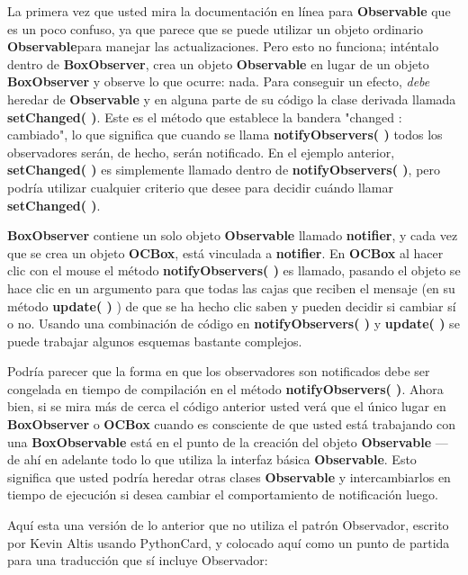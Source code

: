 \documentclass{article}
\begin{document}
La primera vez que usted mira la documentación en línea para \textbf{Observable} que es un poco confuso, ya que parece que se puede utilizar un objeto ordinario \textbf{Observable}para manejar las actualizaciones. Pero esto no funciona; inténtalo \- dentro de \textbf{BoxObserver}, crea un objeto \textbf{Observable} en lugar de un objeto \textbf{BoxObserver} y observe lo que ocurre: nada. Para conseguir un efecto, \textit{debe} heredar de \textbf{Observable} y en alguna parte de su código la clase derivada llamada \textbf{setChanged( )}. Este es el método que establece la bandera "changed : cambiado", lo que significa que cuando se llama \textbf{notifyObservers( )} todos los observadores serán, de hecho, serán notificado. En el ejemplo anterior, \textbf{setChanged( )} es simplemente llamado dentro de \textbf{notifyObservers( )}, pero podría utilizar cualquier criterio que desee para decidir cuándo llamar \textbf{setChanged( )}.      \newline

\textbf{BoxObserver} contiene un solo objeto \textbf{Observable} llamado \textbf{notifier}, y cada vez que se crea un objeto \textbf{OCBox}, está vinculada a \textbf{notifier}.  En \textbf{OCBox} al hacer clic con el mouse el método \textbf{notifyObservers( )} es llamado, pasando el objeto se hace clic en un argumento para que todas las cajas que reciben el mensaje (en su método \textbf{update( ) }) de que se ha hecho clic saben y pueden decidir si cambiar sí o no. Usando una combinación de código en \textbf{notifyObservers( )} y \textbf{update( )} se puede trabajar algunos esquemas bastante complejos.     \newline

Podría parecer que la forma en que los observadores son notificados debe ser congelada en tiempo de compilación en el método \textbf{notifyObservers( )}. Ahora bien, si se mira más de cerca el código anterior usted verá que el único lugar en \textbf{BoxObserver} o \textbf{OCBox} cuando es consciente de que usted está trabajando con una \textbf{BoxObservable} está en el punto de la creación del objeto \textbf{Observable} — de ahí en adelante todo lo que utiliza la interfaz básica \textbf{Observable}. Esto significa que usted podría heredar otras clases \textbf{Observable} y intercambiarlos en tiempo de ejecución si desea cambiar el comportamiento de notificación luego.  \newline

Aquí esta una versión de lo anterior que no utiliza el patrón Observador, escrito por Kevin Altis usando PythonCard, y colocado aquí como un punto de partida para una traducción que sí incluye Observador:  \newline
\end{document}
